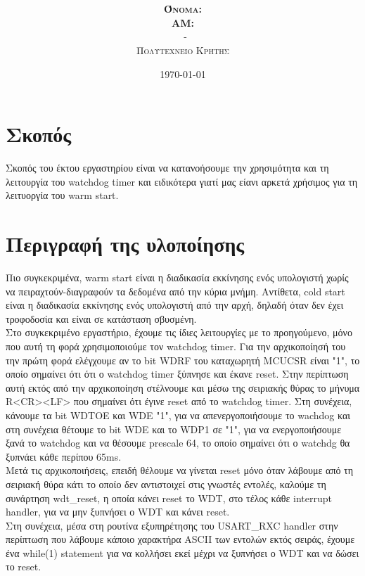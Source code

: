 \documentclass{article}
\title{\underline{\textbf{\assignmentNumber}}}
\author{\textsc{\textbf{Όνομα:}}  \studentName\\
		\textsc{\textbf{ΑΜ:}}  \studentNumber\\
		\course \ - \courseName\\ 
		\textsc{Πολυτεχνείο Κρήτης}
		}
\date{\today}
\begin{document}
	\maketitle

\section*{Σκοπός}
	Σκοπός του έκτου εργαστηρίου είναι να κατανοήσουμε την χρησιμότητα και τη λειτουργία του watchdog timer και ειδικότερα γιατί μας είανι αρκετά χρήσιμος για τη λειτυοργία του warm start. \\

\section*{Περιγραφή της υλοποίησης}
	Πιο συγκεκριμένα, warm start είναι η διαδικασία εκκίνησης ενός υπολογιστή χωρίς να πειραχτούν-διαγραφούν τα δεδομένα από την κύρια μνήμη. Αντίθετα, cold start είναι η διαδικασία εκκίνησης ενός υπολογιστή από την αρχή, δηλαδή όταν δεν έχει τροφοδοσία και είναι σε κατάσταση σβυσμένη.\\
	
	\noindent
	Στο συγκεκριμένο εργαστήριο, έχουμε τις ίδιες λειτουργίες με το προηγούμενο, μόνο που αυτή τη φορά χρησιμοποιούμε τον watchdog timer. Για την αρχικοποίησή του την πρώτη φορά ελέγχουμε αν το bit WDRF του καταχωρητή MCUCSR είναι "1", το οποίο σημαίνει ότι ότι ο watchdog timer ξύπνησε και έκανε reset. Στην περίπτωση αυτή εκτός από την αρχικοποίηση στέλνουμε και μέσω της σειριακής θύρας το μήνυμα R<CR><LF> που σημαίνει ότι έγινε reset από το watchdog timer. Στη συνέχεια, κάνουμε τα bit WDTOE και WDE "1", για να απενεργοποιήσουμε το wachdog και στη συνέχεια θέτουμε το bit WDE και το WDP1 σε "1", για να ενεργοποιήσουμε ξανά το watchdog και να θέσουμε prescale 64, το οποίο σημαίνει ότι ο watchdg θα ξυπνάει κάθε περίπου 65ms.\\
	
	\noindent
	Mετά τις αρχικοποιήσεις, επειδή θέλουμε να γίνεται reset μόνο όταν λάβουμε από τη σειριακή θύρα κάτι το οποίο δεν αντιστοιχεί στις γνωστές εντολές, καλούμε τη συνάρτηση wdt\_reset, η οποία κάνει reset το WDT, στο τέλος κάθε interrupt handler, για να μην ξυπνήσει ο WDT και κάνει reset.\\
	
	\noindent
	Στη συνέχεια, μέσα στη ρουτίνα εξυπηρέτησης του USART\_RXC handler στην περίπτωση που λάβουμε κάποιο χαρακτήρα ASCII των εντολών εκτός σειράς, έχουμε ένα while(1) statement για να κολλήσει εκεί μέχρι να ξυπνήσει ο WDT και να δώσει το reset.
	
\end{document}
